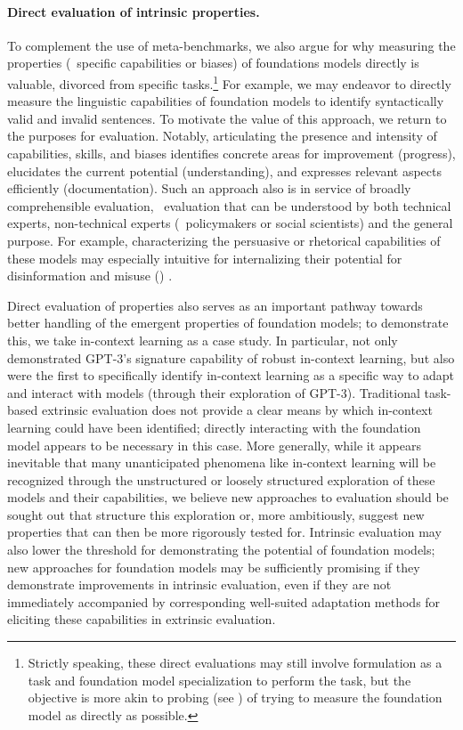 \paragraph{Direct evaluation of intrinsic properties.}
To complement the use of meta-benchmarks, we also argue for why measuring the properties (\eg~specific capabilities or biases) of foundations models directly is valuable, divorced from specific tasks.\footnote{Strictly speaking, these direct evaluations may still involve formulation as a task and foundation model specialization to perform the task, but the objective is more akin to probing (see ) of trying to measure the foundation model as directly as possible.}
For example, we may endeavor to directly measure the linguistic capabilities of foundation models to identify syntactically valid and invalid sentences.
To motivate the value of this approach, we return to the purposes for evaluation.
Notably, articulating the presence and intensity of capabilities, skills, and biases identifies concrete areas for improvement (progress), elucidates the current potential (understanding), and expresses relevant aspects efficiently (documentation).
Such an approach also is in service of broadly comprehensible evaluation, \ie~evaluation that can be understood by both technical experts, non-technical experts (\eg~policymakers or social scientists) and the general purpose.
For example, characterizing the persuasive or rhetorical capabilities of these models may especially intuitive for internalizing their potential for disinformation and misuse () \citep{BuchananCSET2021}.

Direct evaluation of properties also serves as an important pathway towards better handling of the emergent properties of foundation models; to demonstrate this, we take in-context learning as a case study.
In particular, \citet{brown2020gpt3} not only demonstrated GPT-3's signature capability of robust in-context learning, but also were the first to specifically identify in-context learning as a specific way to adapt and interact with models (through their exploration of GPT-3).
Traditional task-based extrinsic evaluation does not provide a clear means by which in-context learning could have been identified; directly interacting with the foundation model appears to be necessary in this case.
More generally, while it appears inevitable that many unanticipated phenomena like in-context learning will be recognized through the unstructured or loosely structured exploration of these models and their capabilities, we believe new approaches to evaluation should be sought out that structure this exploration or, more ambitiously, suggest new properties that can then be more rigorously tested for.
Intrinsic evaluation may also lower the threshold for demonstrating the potential of foundation models; new approaches for foundation models may be sufficiently promising if they demonstrate improvements in intrinsic evaluation, even if they are not immediately accompanied by corresponding well-suited adaptation methods for eliciting these capabilities in extrinsic evaluation.

